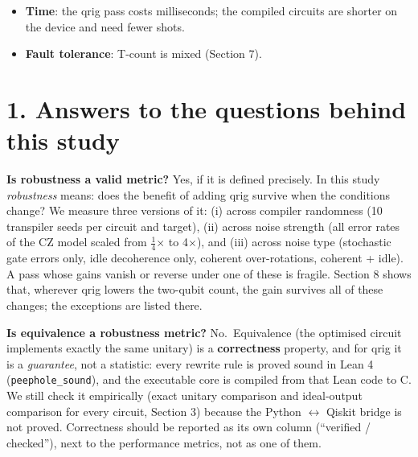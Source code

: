 \documentclass[
  10pt,
]{article}
\begin{document}
\begin{itemize}
  BQSKit: qrig + BQSKit has fewer 2q gates on 24, equal on 69, more on 0
  of 93 circuits, total 10697 \ensuremath{\rightarrow} 7423 (-30.6 \%). The benefit is
  therefore not specific to Qiskit. TKET alone already reaches qrig's
  saving on the MQT Grover and multiplier circuits; on data loading
  (QROM, LCU SELECT, multiplexers), membership oracles and the control
  patterns, qrig lowers the count in front of all three compilers
  (Section 9).
\item
  \textbf{Time}: the qrig pass costs milliseconds; the compiled circuits
  are shorter on the device and need fewer shots.
\item
  \textbf{Fault tolerance}: T-count is mixed (Section 7).
\end{itemize}

\section{1. Answers to the questions behind this
study}\label{answers-to-the-questions-behind-this-study}

\textbf{Is robustness a valid metric?} Yes, if it is defined precisely.
In this study \emph{robustness} means: does the benefit of adding qrig
survive when the conditions change? We measure three versions of it: (i)
across compiler randomness (10 transpiler seeds per circuit and target),
(ii) across noise strength (all error rates of the CZ model scaled from
\ensuremath{\tfrac{1}{4}}\ensuremath{\times} to 4\ensuremath{\times}), and (iii) across noise type (stochastic gate errors only,
idle decoherence only, coherent over-rotations, coherent + idle). A pass
whose gains vanish or reverse under one of these is fragile. Section 8
shows that, wherever qrig lowers the two-qubit count, the gain survives
all of these changes; the exceptions are listed there.

\textbf{Is equivalence a robustness metric?} No.~Equivalence (the
optimised circuit implements exactly the same unitary) is a
\textbf{correctness} property, and for qrig it is a \emph{guarantee},
not a statistic: every rewrite rule is proved sound in Lean 4
(\texttt{peephole\_sound}), and the executable core is compiled from
that Lean code to C. We still check it empirically (exact unitary
comparison and ideal-output comparison for every circuit, Section 3)
because the Python \ensuremath{\leftrightarrow} Qiskit bridge is not proved. Correctness should be
reported as its own column (``verified / checked''), next to the
performance metrics, not as one of them.
\end{document}
